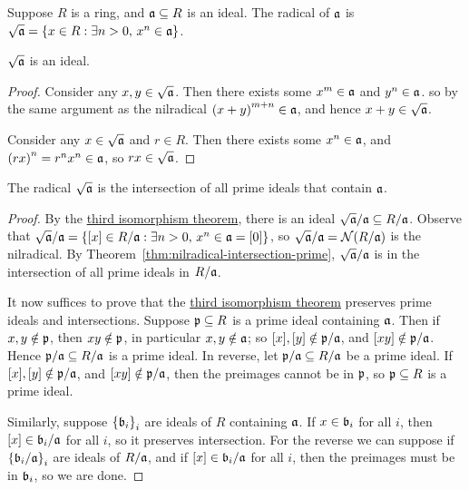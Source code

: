 \begin{definition}
    Suppose \(R\) is a ring, and \(\mathfrak{a} \subseteq R\) is an ideal.
    The radical of \(\mathfrak{a}\) is \(\sqrt{\mathfrak{a}} = \{x \in R: \exists n > 0,\, x^n \in \mathfrak{a}\}\).
\end{definition}
\begin{lemma}
    \(\sqrt{\mathfrak{a}}\) is an ideal.
\end{lemma}
\begin{proof}
    Consider any \(x,y \in \sqrt{\mathfrak{a}}\).
    Then there exists some \(x^m \in \mathfrak{a}\) and \(y^n \in \mathfrak{a}\).
    so by the same argument as the nilradical \({(x+y)}^{m+n} \in \mathfrak{a}\),
    and hence \(x+y \in \sqrt{\mathfrak{a}}\).

    Consider any \(x \in \sqrt{\mathfrak{a}}\) and \(r \in R\).
    Then there exists some \(x^n \in \mathfrak{a}\),
    and \({(rx)}^n = r^n x^n \in \mathfrak{a}\), so \(rx \in \sqrt{\mathfrak{a}}\).
\end{proof}
\begin{theorem}\label{thm:radical-intersection-prime}
    The radical \(\sqrt{\mathfrak{a}}\) is the intersection of all prime ideals that contain \(\mathfrak{a}\).
\end{theorem}
\begin{proof}
    By the \hyperref[thm:iso-3-ring]{third isomorphism theorem},
    there is an ideal \(\sqrt{\mathfrak{a}}/\mathfrak{a} \subseteq R/\mathfrak{a}\).
    Observe that \(\sqrt{\mathfrak{a}}/\mathfrak{a} = \{[x] \in R/\mathfrak{a}: \exists n > 0,\, x^n \in \mathfrak{a} = [0]\}\),
    so \(\sqrt{\mathfrak{a}}/\mathfrak{a} = \operatorname{\mathcal{N}}(R/\mathfrak{a})\) is the nilradical.
    By Theorem~\ref{thm:nilradical-intersection-prime},
    \(\sqrt{\mathfrak{a}}/\mathfrak{a}\) is in the intersection of all prime ideals in \(R/\mathfrak{a}\).

    It now suffices to prove that
    the \hyperref[thm:iso-3-ring]{third isomorphism theorem}
    preserves prime ideals and intersections.
    Suppose \(\mathfrak{p} \subseteq R\) is a prime ideal containing \(\mathfrak{a}\).
    Then if \(x,y \notin \mathfrak{p}\), then \(xy \notin \mathfrak{p}\), in particular \(x,y \notin \mathfrak{a}\);
    so \([x],[y] \notin \mathfrak{p/a}\), and \([xy] \notin \mathfrak{p/a}\).
    Hence \(\mathfrak{p/a} \subseteq R/\mathfrak{a}\) is a prime ideal.
    In reverse, let \(\mathfrak{p/a} \subseteq R/\mathfrak{a}\) be a prime ideal.
    If \([x],[y] \notin \mathfrak{p/a}\), and \([xy] \notin \mathfrak{p/a}\),
    then the preimages cannot be in \(\mathfrak{p}\),
    so \(\mathfrak{p} \subseteq R\) is a prime ideal.

    Similarly, suppose \({\{\mathfrak{b}_i\}}_i\) are ideals of \(R\) containing \(\mathfrak{a}\).
    If \(x \in \mathfrak{b}_i\) for all \(i\),
    then \([x] \in \mathfrak{b}_i/\mathfrak{a}\) for all \(i\),
    so it preserves intersection.
    For the reverse we can suppose if \({\{\mathfrak{b}_i/\mathfrak{a}\}}_i\) are ideals of \(R/\mathfrak{a}\),
    and if \([x] \in \mathfrak{b}_i/\mathfrak{a}\) for all \(i\),
    then the preimages must be in \(\mathfrak{b}_i\),
    so we are done.
\end{proof}
